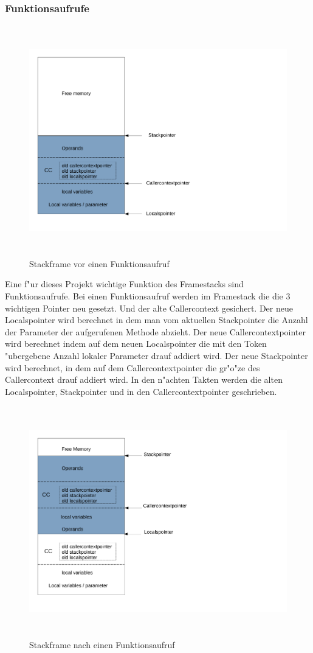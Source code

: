 \subsubsection{Funktionsaufrufe}
\begin{figure}
	\centering
	\includegraphics[height = 10cm]{PS_RS_graphics/StackframebeforeInvoke.pdf}
	\caption{Stackframe vor einen Funktionsaufruf}
\end{figure}
Eine f"ur dieses Projekt wichtige Funktion des Framestacks sind Funktionsaufrufe. Bei einen Funktionsaufruf werden im Framestack die die 3 wichtigen Pointer neu gesetzt. Und der alte Callercontext gesichert. Der neue Localspointer wird berechnet in dem man vom aktuellen Stackpointer die Anzahl der Parameter der aufgerufenen Methode abzieht. Der neue Callercontextpointer wird berechnet indem auf dem neuen Localspointer die mit den Token "ubergebene Anzahl lokaler Parameter drauf addiert wird. Der neue Stackpointer wird berechnet, in dem auf dem Callercontextpointer die gr"o"ze des Callercontext drauf addiert wird. 
In den n"achten Takten werden die alten Localspointer, Stackpointer und in den Callercontextpointer geschrieben. 
\begin{figure}
	\centering
	\includegraphics[height = 10cm]{PS_RS_graphics/StackframeafterInvoke.pdf}
	\caption{Stackframe nach einen Funktionsaufruf}
\end{figure}


